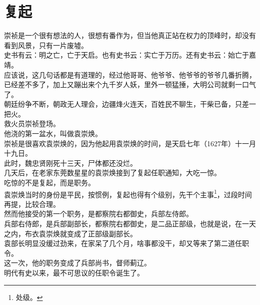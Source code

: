 \section{复起}
\ifnum{}
	\begin{multicols}{\theparacolNo}
\fi
崇祯是一个很有想法的人，很想有番作为，但当他真正站在权力的顶峰时，却没有看到风景，只有一片废墟。\\

史书有云：明之亡，亡于天启。也有史书云：实亡于万历。还有史书云：始亡于嘉靖。\\

应该说，这几句话都是有道理的，经过他哥哥、他爷爷、他爷爷的爷爷几番折腾，已经差不多了，加上又蹦出来个九千岁人妖，里外一顿猛捶，大明公司就剩一口气了。\\

朝廷纷争不断，朝政无人理会，边疆烽火连天，百姓民不聊生，干柴已备，只差一把火。\\

救火员崇祯登场。\\

他浇的第一盆水，叫做袁崇焕。\\

崇祯是很喜欢袁崇焕的，因为他起用袁崇焕的时间，是天启七年（1627年）十一月十九日。\\

此时，魏忠贤刚死十三天，尸体都还没烂。\\

几天后，在老家东莞数星星的袁崇焕接到了复起任职通知，大吃一惊。\\

吃惊的不是复起，而是职务。\\

袁崇焕当时的身份是平民，按惯例，复起也得有个级别，先干个主事\footnote{处级。}，过段时间再提，比较合理。\\

然而他接受的第一个职务，是都察院右都御史，兵部左侍郎。\\

兵部右侍郎，是兵部副部长，都察院右都御史，是二品正部级，也就是说，在一天之内，布衣袁崇焕就变成了正部级副部长。\\

袁部长明显没缓过劲来，在家呆了几个月，啥事都没干，却又等来了第二道任职令。\\

这一次，他的职务变成了兵部尚书，督师蓟辽。\\

明代有史以来，最不可思议的任职令诞生了。\\


\end{multicols}
